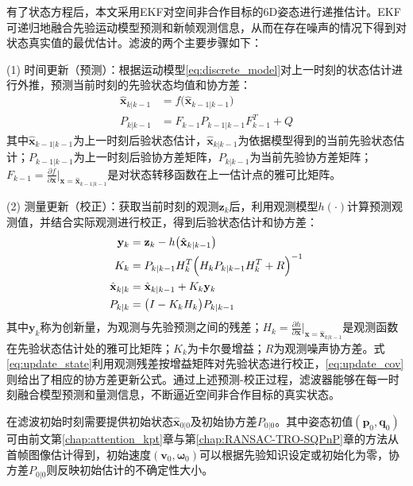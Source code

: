 有了状态方程后，本文采用EKF对空间非合作目标的6D姿态进行递推估计。EKF可递归地融合先验运动模型预测和新帧观测信息，从而在存在噪声的情况下得到对状态真实值的最优估计。滤波的两个主要步骤如下：

(1) 时间更新（预测）：根据运动模型\eqref{eq:discrete_model}对上一时刻的状态估计进行外推，预测当前时刻的先验状态均值和协方差：
\begin{align}
	\hat{\mathbf{x}}_{k|k-1} &= f\bigl(\hat{\mathbf{x}}_{k-1|k-1}\bigr) \label{eq:predict_state}\\
	P_{k|k-1} &= F_{k-1}P_{k-1|k-1}F_{k-1}^T + Q \label{eq:predict_cov}
\end{align}
其中$\hat{\mathbf{x}}_{k-1|k-1}$为上一时刻后验状态估计，$\hat{\mathbf{x}}_{k|k-1}$为依据模型得到的当前先验状态估计；$P_{k-1|k-1}$为上一时刻后验协方差矩阵，$P_{k|k-1}$为当前先验协方差矩阵；$F_{k-1} = \frac{\partial f}{\partial \mathbf{x}}\bigl|_{\mathbf{x}=\hat{\mathbf{x}}_{k-1|k-1}}$是对状态转移函数在上一估计点的雅可比矩阵。

(2) 测量更新（校正）：获取当前时刻的观测$\mathbf{z}_k$后，利用观测模型$h(\cdot)$计算预测观测值，并结合实际观测进行校正，得到后验状态估计和协方差：
\begin{align}
	\mathbf{y}_k &= \mathbf{z}_k - h\bigl(\hat{\mathbf{x}}_{k|k-1}\bigr) \label{eq:innov}\\
	K_k &= P_{k|k-1}H_k^T \Bigl(H_kP_{k|k-1}H_k^T + R\Bigr)^{-1} \label{eq:kgain}\\
	\hat{\mathbf{x}}_{k|k} &= \hat{\mathbf{x}}_{k|k-1} + K_k\mathbf{y}_k \label{eq:update_state}\\
	P_{k|k} &= \bigl(I - K_kH_k\bigr)P_{k|k-1} \label{eq:update_cov}
\end{align}
其中$\mathbf{y}_k$称为创新量，为观测与先验预测之间的残差；$H_k = \frac{\partial h}{\partial \mathbf{x}}\bigl|_{\mathbf{x}=\hat{\mathbf{x}}_{k|k-1}}$是观测函数在先验状态估计处的雅可比矩阵；$K_k$为卡尔曼增益；$R$为观测噪声协方差。式\eqref{eq:update_state}利用观测残差按增益矩阵对先验状态进行校正，\eqref{eq:update_cov}则给出了相应的协方差更新公式。通过上述预测-校正过程，滤波器能够在每一时刻融合模型预测和量测信息，不断逼近空间非合作目标的真实状态。

在滤波初始时刻需要提供初始状态$\hat{\mathbf{x}}_{0|0}$及初始协方差$P_{0|0}$。其中姿态初值$(\mathbf{p}_0,\mathbf{q}_0)$可由前文第\ref{chap:attention_kpt}章与第\ref{chap:RANSAC-TRO-SQPnP}章的方法从首帧图像估计得到，初始速度$(\mathbf{v}_0,\boldsymbol{\omega}_0)$可以根据先验知识设定或初始化为零，协方差$P_{0|0}$则反映初始估计的不确定性大小。


